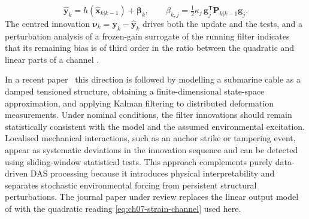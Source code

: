 \documentclass[graybox,envcountchap]{style/SNmono}
\begin{document}
\begin{equation}
\widehat{\mathbf{y}}_k=h(\widehat{\mathbf{x}}_{k|k-1})+\boldsymbol{\beta}_k,
\qquad
\beta_{k,j}=\tfrac12\kappa_j\,\mathbf{g}_j^{\mathsf T}\mathbf{P}_{k|k-1}\mathbf{g}_j .
\label{eq:ch07-second-order-prediction}
\end{equation}
The centred innovation $\boldsymbol{\nu}_k=\mathbf{y}_k-\widehat{\mathbf{y}}_k$ drives both the update and the tests, and a perturbation analysis of a frozen-gain surrogate of the running filter indicates that its remaining bias is of third order in the ratio between the quadratic and linear parts of a channel \cite{oliva_quadratic_ejc_2026}.


In a recent paper~\cite{fioravanti_cable_med_2026} this direction is followed by modelling a submarine cable as a damped tensioned structure, obtaining a finite-dimensional state-space approximation, and applying Kalman filtering to distributed deformation measurements. Under nominal conditions, the filter innovations should remain statistically consistent with the model and the assumed environmental excitation. Localised mechanical interactions, such as an anchor strike or tampering event, appear as systematic deviations in the innovation sequence and can be detected using sliding-window statistical tests. This approach complements purely data-driven DAS processing because it introduces physical interpretability and separates stochastic environmental forcing from persistent structural perturbations. The journal paper under review \cite{oliva_quadratic_ejc_2026} replaces the linear output model of \cite{fioravanti_cable_med_2026} with the quadratic reading \eqref{eq:ch07-strain-channel} used here.
\end{document}
